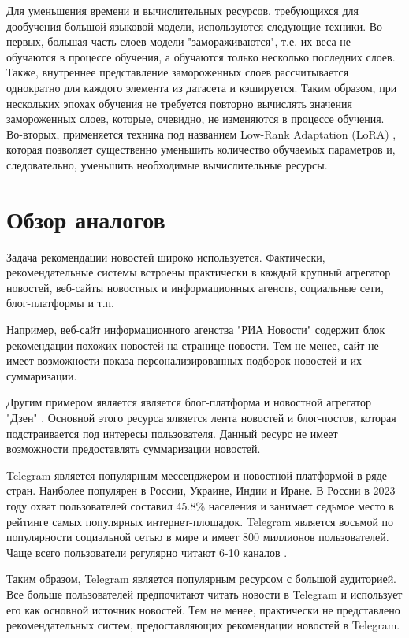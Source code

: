 Для уменьшения времени и вычислительных ресурсов, требующихся для дообучения большой языковой модели, используются следующие техники. Во-первых, большая часть слоев модели "замораживаются", т.е. их веса не обучаются в процессе обучения, а обучаются только несколько последних слоев. Также, внутреннее представление замороженных слоев рассчитывается однократно для каждого элемента из датасета и кэшируется. Таким образом, при нескольких эпохах обучения не требуется повторно вычислять значения замороженных слоев, которые, очевидно, не изменяются в процессе обучения. Во-вторых, применяется техника под названием Low-Rank Adaptation (LoRA) \cite{lora}, которая позволяет существенно уменьшить количество обучаемых параметров и, следовательно, уменьшить необходимые вычислительные ресурсы.

\section{Обзор аналогов}

Задача рекомендации новостей широко используется. Фактически, рекомендательные системы встроены практически в каждый крупный агрегатор новостей, веб-сайты новостных и информационных агенств, социальные сети, блог-платформы и т.п.

Например, веб-сайт информационного агенства "РИА Новости" \cite{ria_news} содержит блок рекомендации похожих новостей на странице новости. Тем не менее, сайт не имеет возможности показа персонализированных подборок новостей и их суммаризации.

Другим примером является является блог-платформа и новостной агрегатор "Дзен" \cite{dzen}. Основной этого ресурса ялвяется лента новостей и блог-постов, которая подстраивается под интересы пользователя. Данный ресурс не имеет возможности предоставлять суммаризации новостей.

Telegram \cite{telegram} является популярным мессенджером и новостной платформой в ряде стран. Наиболее популярен в России, Украине, Индии и Иране. В России в 2023 году охват пользователей составил 45.8\% населения и занимает седьмое место в рейтинге самых популярных интернет-площадок. Telegram является восьмой по популярности социальной сетью в мире и имеет 800 миллионов пользователей. Чаще всего пользователи регулярно читают 6-10 каналов \cite{telegram_stat}.

Таким образом, Telegram является популярным ресурсом с большой аудиторией. Все больше пользователей предпочитают читать новости в Telegram и использует его как основной источник новостей. Тем не менее, практически не представлено рекомендательных систем, предоставляющих рекомендации новостей в Telegram.

